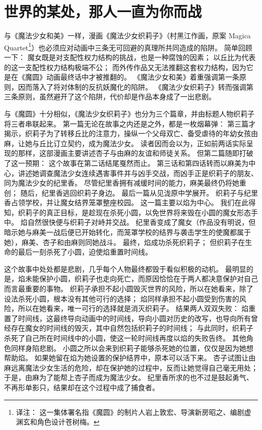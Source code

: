 \chapter[世界的某处，那人一直为你而战]{世界的某处，那人一直为你而战}


与《魔法少女和美》一样，漫画《魔法少女织莉子》（村黑江作画，原案 Magica Quartet\footnote{%
    译注：
    这一集体署名指《魔圆》的制片人岩上敦宏、导演新房昭之、编剧虚渊玄和角色设计苍树梅。
}）也必须应对动画中三条无可回避的真理所共同造成的陷阱。
简单回顾一下：
魔女既是对支配性权力结构的挑战，也是一种腐蚀的因素；
以丘比为代表的这一支配性权力结构极端不公；
而外传作品又无法推翻这套权力结构，因为它是在《魔圆》动画最终话中才被推翻的。
《魔法少女和美》着重强调第一条原则，因而落入了将对体制的反抗妖魔化的陷阱。
《魔法少女织莉子》转而强调第三条原则，虽然避开了这个陷阱，代价却是作品本身成了一出悲剧。

与《魔圆》十分相似，《魔法少女织莉子》也分为三个篇章，并由标题人物织莉子将三者串联起来。
第一篇无论在故事之内还是之外，都是一枚烟幕弹：
第三篇才揭示，织莉子为了转移丘比的注意力，操纵一个父母双亡、备受虐待的年幼女孩由麻，让她与丘比订立契约，成为魔法少女。
读者因而会以为，正如前两话实际呈现的那样，这部漫画主要讲述杏子与由麻的友谊和师徒关系。
但第二篇随即打破了这一预期：
这个故事在第二话结尾戛然而止。
第三话和第四话转而以麻美为中心，讲述她调查魔法少女连续遇害事件并与凶手交战，而凶手正是织莉子的朋友、同为魔法少女的纪里香。
尽管纪里香拥有减缓时间的能力，麻美最终仍将她重创；
随后，纪里香逃回织莉子身边。
最后一篇从见泷原中学展开。
织莉子与纪里香占领学校，并让魔女结界笼罩整座校园。
这一篇主要以焰为中心。
我们在此得知，织莉子的真正目标，是趁现在杀死小圆，以免世界将来毁在小圆的魔女形态手中。
焰自然很快便与织莉子对峙并交战。
纪里香变成了魔女（作品没有明说，但暗示她与麻美一战后便已开始转化，而笼罩学校的结界与袭击学生的使魔都属于她），麻美、杏子和由麻则同她战斗。
最终，焰成功杀死织莉子；
但织莉子在生命的最后一刻杀死了小圆，迫使焰重置时间线。

这个故事中处处都是悲剧，几乎每个人物最终都毁于看似积极的动机。
最明显的是，焰未能保护小圆，织莉子也走向死亡，而原因恰恰在于两人都决意保护对自己而言最重要的事物。
织莉子承担不起小圆毁灭世界的风险，所以在她看来，除了设法杀死小圆，根本没有其他可行的选择；
焰同样承担不起小圆受到伤害的风险，所以在她看来，唯一可行的选择就是消灭织莉子。
结果两人双双失败：
焰重置了时间线，这最终导向动画中的时间线，导向小圆对历史的改写，也导向所有曾经存在魔女的时间线的毁灭，其中自然包括织莉子的时间线；
与此同时，织莉子杀死了自己所在时间线中的小圆，使这一轮时间线再度以焰的失败告终。
其他角色同样身陷悲剧。
小圆之所以会来到织莉子能够杀死她的位置，仅仅是因为她想帮助焰。
如果她留在焰为她设置的保护结界中，原本可以活下来。
杏子试图让由麻远离魔法少女生活的危险，却在保护她的过程中，反而让她觉得自己毫无用处；
于是，由麻为了能帮上杏子而成为魔法少女。
纪里香所求的也不过是鼓起勇气、不再形单影只，结果却在这个过程中成了捕食者。

